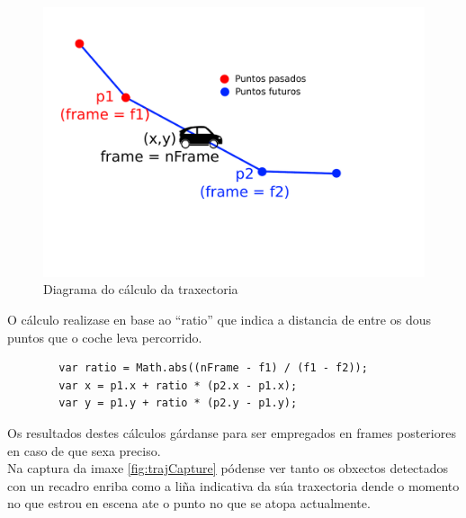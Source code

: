     \begin{figure}[htp]
    \begin{center}
        \includegraphics[scale=0.4]{figures/calcTrajectory.pdf}
        \caption{Diagrama do cálculo da traxectoria}
    \label{fig:calcTrajectory}
    \end{center}
    \end{figure}
    
    O cálculo realizase en base ao ``ratio'' que indica a distancia de entre os dous puntos que o coche 
    leva percorrido.
    
    \begin{verbatim}
        var ratio = Math.abs((nFrame - f1) / (f1 - f2));
        var x = p1.x + ratio * (p2.x - p1.x);
        var y = p1.y + ratio * (p2.y - p1.y);    
    \end{verbatim}
    
    Os resultados destes cálculos gárdanse para ser empregados en frames posteriores en caso de que
    sexa preciso.\\
    
    Na captura da imaxe \ref{fig:trajCapture} pódense ver tanto os obxectos detectados con un 
    recadro enriba como a liña indicativa da súa traxectoria dende o momento no que estrou en 
    escena ate o punto no que se atopa actualmente.
    
